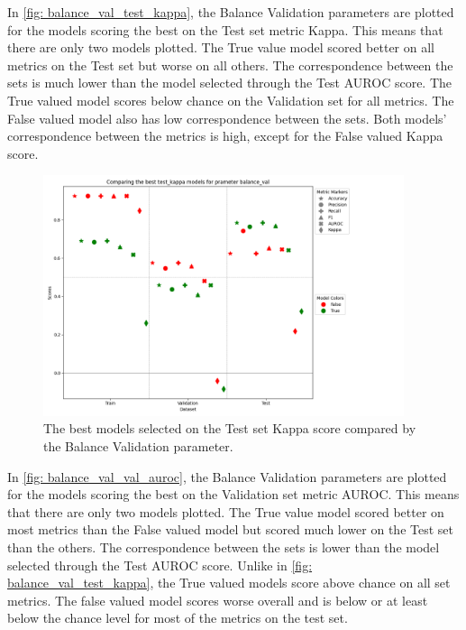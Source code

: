 In \autoref{fig: balance_val_test_kappa}, the Balance Validation parameters are plotted for the models scoring the best on the Test set metric Kappa. This means that there are only two models plotted. The True value model scored better on all metrics on the Test set but worse on all others. The correspondence between the sets is much lower than the model selected through the Test AUROC score. The True valued model scores below chance on the Validation set for all metrics. The False valued model also has low correspondence between the sets. Both models' correspondence between the metrics is high, except for the False valued Kappa score.

\begin{figure}[H]
    \centering
    \includegraphics[width=400px]{Figures/results/balance_val/balance_val_test_kappa.png}
    \caption{The best models selected on the Test set Kappa score compared by the Balance Validation parameter.}
    \label{fig: balance_val_test_kappa}
\end{figure}

In \autoref{fig: balance_val_val_auroc}, the Balance Validation parameters are plotted for the models scoring the best on the Validation set metric AUROC. This means that there are only two models plotted. The True value model scored better on most metrics than the False valued model but scored much lower on the Test set than the others. The correspondence between the sets is lower than the model selected through the Test AUROC score. Unlike in \autoref{fig: balance_val_test_kappa}, the True valued models score above chance on all set metrics. The false valued model scores worse overall and is below or at least below the chance level for most of the metrics on the test set.


